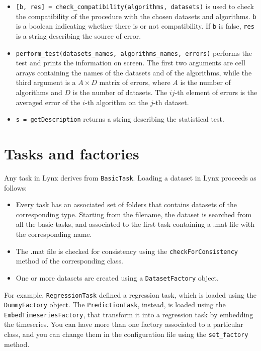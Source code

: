 \begin{itemize}
\item \verb|[b, res] = check_compatibility(algorithms, datasets)| is used
to check the compatibility of the procedure with the chosen datasets
and algorithms. \verb|b| is a boolean indicating whether there is or not
compatibility. If \verb|b| is false, \verb|res| is a string describing the source of error.
\item \verb|perform_test(datasets_names, algorithms_names, errors)| performs
the test and prints the information on screen. The first two arguments are cell arrays containing the names of the datasets and of the algorithms, while the third argument is a $A \times D$ matrix of errors, where $A$ is the number of algorithms and $D$ is the number of datasets. The $ij$-th element of errors is the averaged error of the $i$-th algorithm on the $j$-th dataset.
\item \verb|s = getDescription| returns a string describing the statistical test.
\end{itemize}

\section{Tasks and factories}

Any task in Lynx derives from \verb|BasicTask|. Loading a dataset in Lynx proceeds as follows:

\begin{itemize}
\item Every task has an associated set of folders that contains datasets of the corresponding type. Starting from the filename, the dataset is searched from all the basic tasks, and associated to the first task containing a .mat file with the corresponding name.
\item The .mat file is checked for consistency using the \verb|checkForConsistency| method of the corresponding class.
\item One or more datasets are created using a \verb|DatasetFactory| object.
\end{itemize}

\noindent For example, \verb|RegressionTask| defined a regression task, which is loaded using the \verb|DummyFactory| object. The \verb|PredictionTask|, instead, is loaded using the \verb|EmbedTimeseriesFactory|, that transform it into a regression task by embedding the timeseries. You can have more than one factory associated to a particular class, and you can change them in the configuration file using the \verb|set_factory| method.

